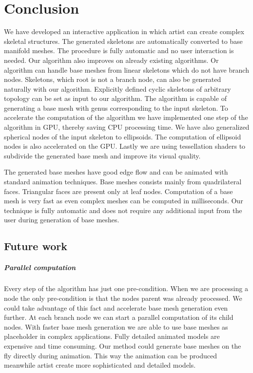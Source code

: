 \chapter{Conclusion}

We have developed an interactive application in which artist can create complex skeletal structures.
The generated skeletons are automatically converted to base manifold meshes.
The procedure is fully automatic and no user interaction is needed.
Our algorithm also improves on already existing algorithms.
Or algorithm can handle base meshes from linear skeletons which do not have branch nodes.
Skeletons, which root is not a branch node, can also be generated naturally with our algorithm.
Explicitly defined cyclic skeletons of arbitrary topology can be set as input to our algorithm.
The algorithm is capable of generating a base mesh with genus corresponding to the input skeleton.
To accelerate the computation of the algorithm we have implemented one step of the algorithm in GPU, thereby saving CPU processing time.
We have also generalized spherical nodes of the input skeleton to ellipsoids.
The computation of ellipsoid nodes is also accelerated on the GPU.
Lastly we are using tessellation shaders to subdivide the generated base mesh and improve its visual quality.

The generated base meshes have good edge flow and can be animated with standard animation techniques.
Base meshes consists mainly from quadrilateral faces.
Triangular faces are present only at leaf nodes.
Computation of a base mesh is very fast as even complex meshes can be computed in milliseconds.
Our technique is fully automatic and does not require any additional input from the user during generation of base meshes.

\section{Future work}

\paragraph{Parallel computation}
Every step of the algorithm has just one pre-condition.
When we are processing a node the only pre-condition is that the nodes parent was already processed.
We could take advantage of this fact and accelerate base mesh generation even further.
At each branch node we can start a parallel computation of its child nodes.
With faster base mesh generation we are able to use base meshes as placeholder in complex applications.
Fully detailed animated models are expensive and time consuming.
Our method could generate base meshes on the fly directly during animation.
This way the animation can be produced meanwhile artist create more sophisticated and detailed models.

